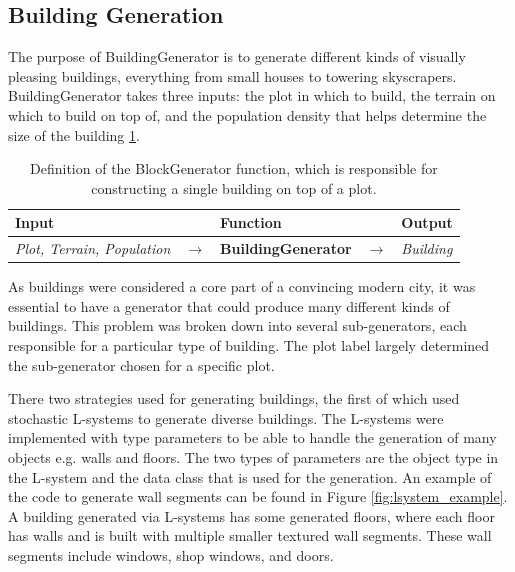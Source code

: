 \subsection{Building Generation}
The purpose of BuildingGenerator is to generate different kinds of visually pleasing buildings, everything from small houses to towering skyscrapers. 
BuildingGenerator takes three inputs: the plot in which to build, the terrain on which to build on top of, and the population density that helps determine the size of the building \ref{table:buildinggen}.

\begin{table}[H]
  \centering
  \begin{tabular}{lllll}
    \textbf{Input}                           &               & \textbf{Function}            &               & \textbf{Output}         \\
    \midrule
    \textit{Plot, Terrain, Population}       & $\rightarrow$ & \textbf{BuildingGenerator}   & $\rightarrow$ & \textit{Building}       \\
    \bottomrule
  \end{tabular}
  
  \caption{Definition of the BlockGenerator function, which is responsible for constructing a single building on top of a plot.}
  \label{table:buildinggen} 
\end{table}
\vspace{-0.4cm} 

As buildings were considered a core part of a convincing modern city, it was essential to have a generator that could produce many different kinds of buildings. 
This problem was broken down into several sub-generators, each responsible for a particular type of building.
The plot label largely determined the sub-generator chosen for a specific plot.

There two strategies used for generating buildings, the first of which used stochastic L-systems to generate diverse buildings.
The L-systems were implemented with type parameters to be able to handle the generation of many objects e.g. walls and floors.
The two types of parameters are the object type in the L-system and the data class that is used for the generation.
An example of the code to generate wall segments can be found in Figure \ref{fig:lsystem_example}.
A building generated via L-systems has some generated floors, where each floor has walls and is built with multiple smaller textured wall segments. 
These wall segments include windows, shop windows, and doors.

